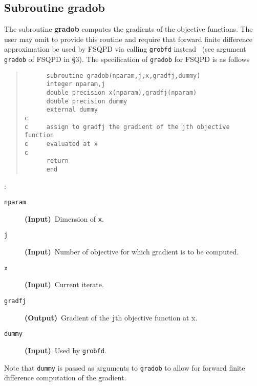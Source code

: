 \subsection{Subroutine gradob} 
The subroutine {\bf gradob} computes the gradients of the 
objective functions.
The user may omit to provide this routine and require that 
forward finite difference
approximation be used by FSQPD via calling {\tt grobfd} instead~
(see argument {\tt gradob} of FSQPD in \S 3).
The specification of {\tt gradob} for FSQPD is as follows
\begin{quote}
\begin{verbatim}
      subroutine gradob(nparam,j,x,gradfj,dummy)
      integer nparam,j
      double precision x(nparam),gradfj(nparam)
      double precision dummy
      external dummy
c     
c     assign to gradfj the gradient of the jth objective function 
c     evaluated at x
c
      return
      end
\end{verbatim}
\end{quote}
:
\begin{description}
\item[\tt nparam] {\bf (Input)}~Dimension of {\tt x}.
\item[\tt j]      {\bf (Input)}~Number of objective for 
                  which gradient is to be computed.
\item[\tt x]      {\bf (Input)}~Current iterate.
\item[\tt gradfj]  {\bf (Output)}~Gradient of the {\tt j}th objective 
                   function at x.
\item[\tt dummy]  {\bf (Input)}~Used by {\tt grobfd}.
\end{description}
Note that {\tt  dummy} is 
passed as arguments to {\tt gradob} to allow for forward finite 
difference computation of the gradient.

